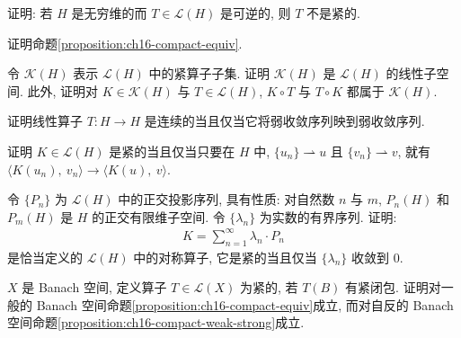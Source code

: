 \documentclass[../../main.tex]{subfiles}
\begin{document}
\begin{exercise}\label{exercise:ch16-44}
证明: 若 $H$ 是无穷维的而 $T\in\mathcal{L}(H)$ 是可逆的, 则 $T$ 不是紧的.
\end{exercise}

\begin{exercise}\label{exercise:ch16-45}
证明命题\cref{proposition:ch16-compact-equiv}.
\end{exercise}

\begin{exercise}\label{exercise:ch16-46}
令 $\mathcal{K}(H)$ 表示 $\mathcal{L}(H)$ 中的紧算子子集. 证明 $\mathcal{K}(H)$ 是 $\mathcal{L}(H)$ 的线性子空间. 此外, 证明对 $K\in\mathcal{K}(H)$ 与 $T\in\mathcal{L}(H)$, $K\circ T$ 与 $T\circ K$ 都属于 $\mathcal{K}(H)$.
\end{exercise}

\begin{exercise}\label{exercise:ch16-47}
证明线性算子 $T:H\to H$ 是连续的当且仅当它将弱收敛序列映到弱收敛序列.
\end{exercise}

\begin{exercise}\label{exercise:ch16-48}
证明 $K\in\mathcal{L}(H)$ 是紧的当且仅当只要在 $H$ 中, $\{u_{n}\}\rightharpoonup u$ 且 $\{v_{n}\}\rightharpoonup v$, 就有 $\langle K(u_{n}),\ v_{n}\rangle\to\langle K(u),\ v\rangle$.
\end{exercise}

\begin{exercise}\label{exercise:ch16-49}
令 $\{P_{n}\}$ 为 $\mathcal{L}(H)$ 中的正交投影序列, 具有性质: 对自然数 $n$ 与 $m$, $P_{n}(H)$ 和 $P_{m}(H)$ 是 $H$ 的正交有限维子空间. 令 $\{\lambda_{n}\}$ 为实数的有界序列. 证明:
\begin{align*}
K=\sum_{n=1}^{\infty}\lambda_{n}\cdot P_{n}
\end{align*}
是恰当定义的 $\mathcal{L}(H)$ 中的对称算子, 它是紧的当且仅当 $\{\lambda_{n}\}$ 收敛到 $0$.
\end{exercise}

\begin{exercise}\label{exercise:ch16-50}
$X$ 是 Banach 空间, 定义算子 $T\in\mathcal{L}(X)$ 为紧的, 若 $T(B)$ 有紧闭包. 证明对一般的 Banach 空间命题\cref{proposition:ch16-compact-equiv}成立, 而对自反的 Banach 空间命题\cref{proposition:ch16-compact-weak-strong}成立.
\end{exercise}
\end{document}
